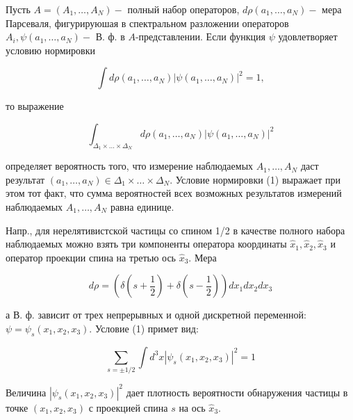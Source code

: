 \documentclass[10pt]{article}
\begin{document}
Пусть $A=\left(A_{1}, \ldots, A_{N}\right)-$ полный набор операторов, $d \rho\left(a_{1}, \ldots, a_{N}\right)-$ мера Парсеваля, фигурируюшая в спектральном разложении операторов $A_{i}, \psi\left(a_{1}, \ldots, a_{N}\right)-$ В. ф. в $A$-представлении. Если функция $\psi$ удовлетворяет условию нормировки



\[

\int d \rho\left(a_{1}, \ldots, a_{N}\right)\left|\psi\left(a_{1}, \ldots, a_{N}\right)\right|^{2}=1,

\]



то выражение



\[

\int_{\Delta_{1} \times \ldots \times \Delta_{N}} d \rho\left(a_{1}, \ldots, a_{N}\right)\left|\psi\left(a_{1}, \ldots, a_{N}\right)\right|^{2}

\]



определяет вероятность того, что измерение наблюдаемых $A_{1}, \ldots, A_{N}$ даст результат $\left(a_{1}, \ldots, a_{N}\right) \in \Delta_{1} \times \ldots \times \Delta_{N}$. Условие нормировки (1) выражает при этом тот факт, что сумма вероятностей всех возможных результатов измерений наблюдаемых $A_{1}, \ldots, A_{N}$ равна единице.



Напр., для нерелятивистской частицы со спином 1/2 в качестве полного набора наблюдаемых можно взять три компоненты оператора координаты $\hat{x}_{1}, \hat{x}_{2}, \hat{x}_{3}$ и оператор проекции спина на третью ось $\hat{x}_{3}$. Мера



\[

d \rho=\left(\delta\left(s+\frac{1}{2}\right)+\delta\left(s-\frac{1}{2}\right)\right) d x_{1} d x_{2} d x_{3}

\]



а В. ф. зависит от трех непрерывных и одной дискретной переменной: $\psi=\psi_{s}\left(x_{1}, x_{2}, x_{3}\right)$. Условие (1) примет вид:



\[

\sum_{s= \pm 1 / 2} \int d^{3} x\left|\psi_{s}\left(x_{1}, x_{2}, x_{3}\right)\right|^{2}=1

\]



Величина $\left|\psi_{s}\left(x_{1}, x_{2}, x_{3}\right)\right|^{2}$ дает плотность вероятности обнаружения частицы в точке $\left(x_{1}, x_{2}, x_{3}\right)$ с проекцией спина $s$ на ось $\hat{x}_{3}$.
\end{document}
